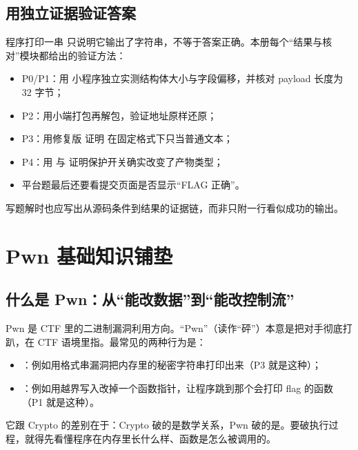 \documentclass[UTF8,12pt,oneside]{ctexbook}
\begin{document}
\section{用独立证据验证答案}
程序打印一串  只说明它输出了字符串，不等于答案正确。本册每个“结果与核对”模块都给出的验证方法：
\begin{itemize}
\item P0/P1：用  小程序独立实测结构体大小与字段偏移，并核对 payload 长度为 32 字节；
\item P2：用小端打包再解包，验证地址原样还原；
\item P3：用修复版  证明  在固定格式下只当普通文本；
\item P4：用  与  证明保护开关确实改变了产物类型；
\item 平台题最后还要看提交页面是否显示“FLAG 正确”。
\end{itemize}
写题解时也应写出从源码条件到结果的证据链，而非只附一行看似成功的输出。

\chapter{Pwn 基础知识铺垫}

\section{什么是 Pwn：从“能改数据”到“能改控制流”}
Pwn 是 CTF 里的二进制漏洞利用方向。“Pwn”（读作“砰”）本意是把对手彻底打趴，在 CTF 语境里指。最常见的两种行为是：
\begin{itemize}
\item {}：例如用格式串漏洞把内存里的秘密字符串打印出来（P3 就是这种）；
\item {}：例如用越界写入改掉一个函数指针，让程序跳到那个会打印 flag 的函数（P1 就是这种）。
\end{itemize}
它跟 Crypto 的差别在于：Crypto 破的是数学关系，Pwn 破的是。要破执行过程，就得先看懂程序在内存里长什么样、函数是怎么被调用的。
\end{document}
